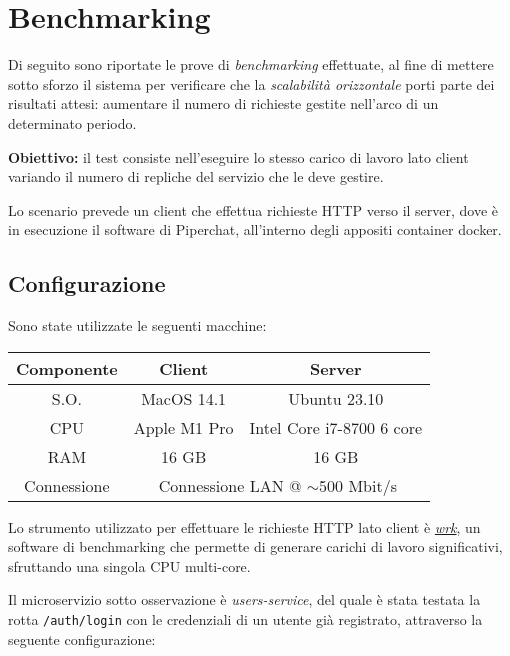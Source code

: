 \section{Benchmarking}

Di seguito sono riportate le prove di \emph{benchmarking} effettuate, al fine di mettere sotto sforzo il sistema per verificare che la \emph{scalabilità orizzontale} porti parte dei risultati attesi: aumentare il numero di richieste gestite nell'arco di un determinato periodo.

\textbf{Obiettivo:}
il test consiste nell'eseguire lo stesso carico di lavoro lato client variando il numero di repliche del servizio che le deve gestire.

Lo scenario prevede un client che effettua richieste HTTP verso il server, dove è in esecuzione il software di Piperchat, all'interno degli appositi container docker.

%
%
%
\subsection{Configurazione}

Sono state utilizzate le seguenti macchine:

\begin{table}[H]
\centering
\begin{tabular}{|c|cc|}
\hline
\textbf{Componente} & \multicolumn{1}{c|}{\textbf{Client}} & \textbf{Server}           \\ \hline
S.O.                & \multicolumn{1}{c|}{MacOS 14.1}      & Ubuntu 23.10              \\ \hline
CPU                 & \multicolumn{1}{c|}{Apple M1 Pro}    & Intel Core i7-8700 6 core \\ \hline
RAM                 & \multicolumn{1}{c|}{16 GB}           & 16 GB                     \\ \hline
Connessione         & \multicolumn{2}{c|}{Connessione LAN @ $\sim$500 Mbit/s}                \\ \hline
\end{tabular}
\end{table}

Lo strumento utilizzato per effettuare le richieste HTTP lato client è \href{https://github.com/wg/wrk}{\emph{wrk}}, un software di benchmarking che permette di generare carichi di lavoro significativi, sfruttando una singola CPU multi-core.

Il microservizio sotto osservazione è \emph{users-service}, del quale è stata testata la rotta \texttt{/auth/login} con le credenziali di un utente già registrato, attraverso la seguente configurazione:

